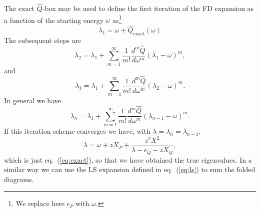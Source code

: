 The exact $\hat{Q}$-box
may be used to define the first iteration of
the FD expansion as a function of the starting energy 
$\omega$ as\footnote{We replace here $\epsilon_P$ with $\omega$.}
\begin{equation}
      \lambda_1= \omega+\hat{Q}_{\mathrm{exact}}(\omega)
\end{equation}
The subsequent steps are
\begin{equation}
     \lambda_2= \lambda_1+
     {\displaystyle \sum_{m=1}^{\infty}
     \frac{1}{m!}\frac{d^m \hat{Q}}{d\omega^m}(\lambda_1
     -\omega )^m },
\end{equation}
and
\begin{equation}
    \lambda_3= \lambda_1+
     {\displaystyle \sum_{m=1}^{\infty}
     \frac{1}{m!}\frac{d^m \hat{Q}}{d\omega^m}(\lambda_2-
     \omega )^m }.
\end{equation}
In general we have
\begin{equation}
     \lambda_n= \lambda_1+
     {\displaystyle \sum_{m=1}^{\infty}
     \frac{1}{m!}\frac{d^m \hat{Q}}{d\omega^m}(\lambda_{n-1}-
     \omega )^m }.
\end{equation}
If this iteration scheme converges we have, with
$\lambda=\lambda_{n}=\lambda_{n-1}$,
\begin{equation}
   \lambda=\omega +zX_P+\frac{z^2X^2}{\lambda -\epsilon_Q-zX_Q},
   \label{eq:exact2}
\end{equation}
which is just eq.\ (\ref{eq:exact}), so that we have
obtained the true eigenvalues.
In a similar way we can use the LS expansion defined
in eq.\ (\ref{eq:ls}) to sum the folded diagrams.

